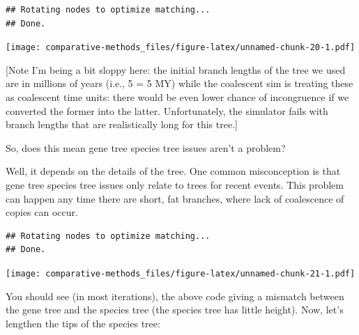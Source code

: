 \documentclass[]{article}
\newenvironment{Shaded}{\begin{snugshade}}{\end{snugshade}}
\newcommand{\DecValTok}[1]{\textcolor[rgb]{0.00,0.00,0.81}{#1}}
\newcommand{\KeywordTok}[1]{\textcolor[rgb]{0.13,0.29,0.53}{\textbf{#1}}}
\newcommand{\NormalTok}[1]{#1}
\newcommand{\OperatorTok}[1]{\textcolor[rgb]{0.81,0.36,0.00}{\textbf{#1}}}
\newcommand{\StringTok}[1]{\textcolor[rgb]{0.31,0.60,0.02}{#1}}
\theoremstyle{definition}
\theoremstyle{definition}
\theoremstyle{definition}
\theoremstyle{remark}
\begin{document}
\begin{verbatim}
## Rotating nodes to optimize matching...
## Done.
\end{verbatim}

\texttt{[image: comparative-methods\_files/figure-latex/unnamed-chunk-20-1.pdf]}

{[}Note I'm being a bit sloppy here: the initial branch lengths of the
tree we used are in millions of years (i.e., 5 = 5 MY) while the
coalescent sim is treating these as coalescent time units: there would
be even lower chance of incongruence if we converted the former into the
latter. Unfortunately, the simulator fails with branch lengths that are
realistically long for this tree.{]}

So, does this mean gene tree species tree issues aren't a problem?

Well, it depends on the details of the tree. One common misconception is
that gene tree species tree issues only relate to trees for recent
events. This problem can happen any time there are short, fat branches,
where lack of coalescence of copies can occur.

\begin{Shaded}
\end{Shaded}

\begin{verbatim}
## Rotating nodes to optimize matching...
## Done.
\end{verbatim}

\texttt{[image: comparative-methods\_files/figure-latex/unnamed-chunk-21-1.pdf]}

You should see (in most iterations), the above code giving a mismatch
between the gene tree and the species tree (the species tree has little
height). Now, let's lengthen the tips of the species tree:
\end{document}
